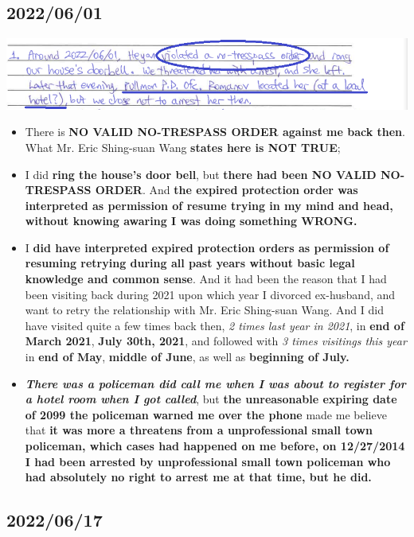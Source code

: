 \documentclass[9pt, b5paper]{article}
\begin{document}
\subsection{2022/06/01}
\label{sec-4-1}

\includegraphics[width=.9\linewidth]{./pic/dearCousin_20220920_142716.png}
\begin{itemize}
\item There is \textbf{NO VALID NO-TRESPASS ORDER against me back then}. What Mr. Eric Shing-suan Wang \textbf{states here is NOT TRUE};
\item I did \textbf{ring the house's door bell}, but \textbf{there had been NO VALID NO-TRESPASS ORDER}. And \textbf{the expired protection order was interpreted as permission of resume trying in my mind and head, without knowing awaring I was doing something WRONG.}
\item I \textbf{did have interpreted expired protection orders as permission of resuming retrying during all past years without basic legal knowledge and common sense}. And it had been the reason that I had been visiting back during 2021 upon which year I divorced ex-husband, and want to retry the relationship with Mr. Eric Shing-suan Wang. And I did have visited quite a few times back then, \emph{2 times last year in 2021}, in \textbf{end of March 2021}, \textbf{July 30th, 2021}, and followed with \emph{3 times visitings this year} in \textbf{end of May}, \textbf{middle of June}, as well as \textbf{beginning of July.}
\item \emph{\textbf{There was a policeman did call me when I was about to register for a hotel room when I got called}}, but \textbf{the unreasonable expiring date of 2099 the policeman warned me over the phone} made me believe that \textbf{it was more a threatens from a unprofessional small town policeman, which cases had happened on me before, on 12/27/2014 I had been arrested by unprofessional small town policeman who had absolutely no right to arrest me at that time, but he did.}
\end{itemize}
\subsection{2022/06/17}
\label{sec-4-2}
\end{document}
